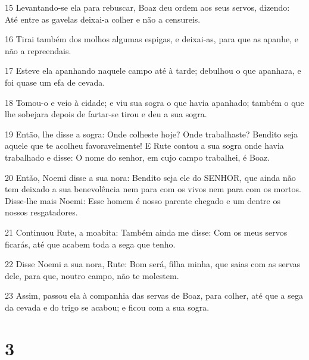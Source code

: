 \par 15 Levantando-se ela para rebuscar, Boaz deu ordem aos seus servos, dizendo: Até entre as gavelas deixai-a colher e não a censureis.
\par 16 Tirai também dos molhos algumas espigas, e deixai-as, para que as apanhe, e não a repreendais.
\par 17 Esteve ela apanhando naquele campo até à tarde; debulhou o que apanhara, e foi quase um efa de cevada.
\par 18 Tomou-o e veio à cidade; e viu sua sogra o que havia apanhado; também o que lhe sobejara depois de fartar-se tirou e deu a sua sogra.
\par 19 Então, lhe disse a sogra: Onde colheste hoje? Onde trabalhaste? Bendito seja aquele que te acolheu favoravelmente! E Rute contou a sua sogra onde havia trabalhado e disse: O nome do senhor, em cujo campo trabalhei, é Boaz.
\par 20 Então, Noemi disse a sua nora: Bendito seja ele do SENHOR, que ainda não tem deixado a sua benevolência nem para com os vivos nem para com os mortos. Disse-lhe mais Noemi: Esse homem é nosso parente chegado e um dentre os nossos resgatadores.
\par 21 Continuou Rute, a moabita: Também ainda me disse: Com os meus servos ficarás, até que acabem toda a sega que tenho.
\par 22 Disse Noemi a sua nora, Rute: Bom será, filha minha, que saias com as servas dele, para que, noutro campo, não te molestem.
\par 23 Assim, passou ela à companhia das servas de Boaz, para colher, até que a sega da cevada e do trigo se acabou; e ficou com a sua sogra.

\chapter{3}

